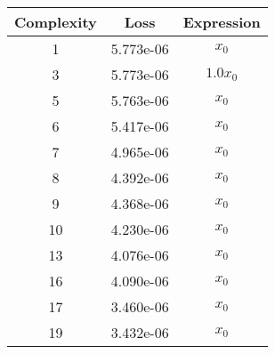 \begin{center}
        \begin{tabular}{|c|c|c|}
        \hline
        Complexity & Loss & Expression \\
        \hline
        1 & 5.773e-06 & $\begin{aligned}x_{0}\end{aligned}$\\ \hline3 & 5.773e-06 & $\begin{aligned}1.0 x_{0}\end{aligned}$\\ \hline5 & 5.763e-06 & $\begin{aligned}x_{0}\end{aligned}$\\ \hline6 & 5.417e-06 & $\begin{aligned}x_{0}\end{aligned}$\\ \hline7 & 4.965e-06 & $\begin{aligned}x_{0}\end{aligned}$\\ \hline8 & 4.392e-06 & $\begin{aligned}x_{0}\end{aligned}$\\ \hline9 & 4.368e-06 & $\begin{aligned}x_{0}\end{aligned}$\\ \hline10 & 4.230e-06 & $\begin{aligned}x_{0}\end{aligned}$\\ \hline13 & 4.076e-06 & $\begin{aligned}x_{0}\end{aligned}$\\ \hline16 & 4.090e-06 & $\begin{aligned}x_{0}\end{aligned}$\\ \hline17 & 3.460e-06 & $\begin{aligned}x_{0}\end{aligned}$\\ \hline19 & 3.432e-06 & $\begin{aligned}x_{0}\end{aligned}$\\ \hline\end{tabular}
        \end{center}
        